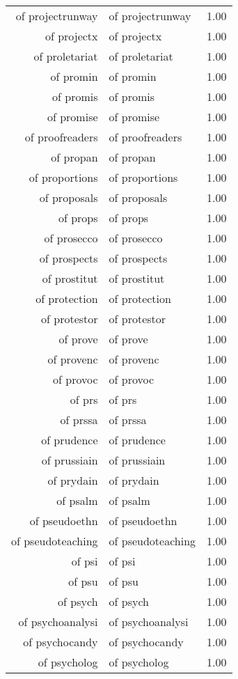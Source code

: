 \begin{table}[ht]
\begin{tabular}{rlr}
  of projectrunway & of projectrunway & 1.00 \\ 
  of projectx & of projectx & 1.00 \\ 
  of proletariat & of proletariat & 1.00 \\ 
  of promin & of promin & 1.00 \\ 
  of promis & of promis & 1.00 \\ 
  of promise & of promise & 1.00 \\ 
  of proofreaders & of proofreaders & 1.00 \\ 
  of propan & of propan & 1.00 \\ 
  of proportions & of proportions & 1.00 \\ 
  of proposals & of proposals & 1.00 \\ 
  of props & of props & 1.00 \\ 
  of prosecco & of prosecco & 1.00 \\ 
  of prospects & of prospects & 1.00 \\ 
  of prostitut & of prostitut & 1.00 \\ 
  of protection & of protection & 1.00 \\ 
  of protestor & of protestor & 1.00 \\ 
  of prove & of prove & 1.00 \\ 
  of provenc & of provenc & 1.00 \\ 
  of provoc & of provoc & 1.00 \\ 
  of prs & of prs & 1.00 \\ 
  of prssa & of prssa & 1.00 \\ 
  of prudence & of prudence & 1.00 \\ 
  of prussiain & of prussiain & 1.00 \\ 
  of prydain & of prydain & 1.00 \\ 
  of psalm & of psalm & 1.00 \\ 
  of pseudoethn & of pseudoethn & 1.00 \\ 
  of pseudoteaching & of pseudoteaching & 1.00 \\ 
  of psi & of psi & 1.00 \\ 
  of psu & of psu & 1.00 \\ 
  of psych & of psych & 1.00 \\ 
  of psychoanalysi & of psychoanalysi & 1.00 \\ 
  of psychocandy & of psychocandy & 1.00 \\ 
  of psycholog & of psycholog & 1.00 \\ 

\end{tabular}
\end{table}
